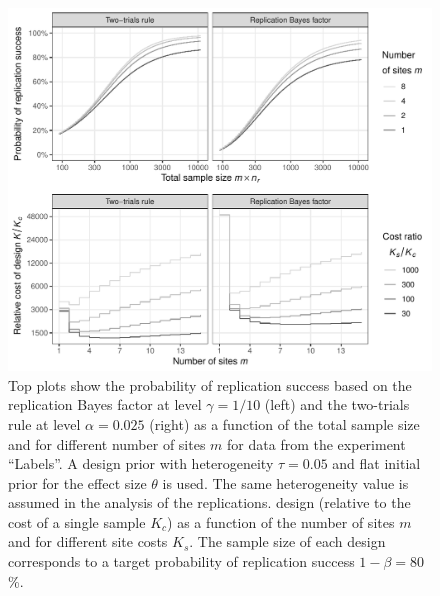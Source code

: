 \begin{figure}[!htb]
\begin{knitrout}
\color{fgcolor}
\includegraphics[width=\textwidth]{images/paper3/multisite-protzko-1}
\end{knitrout}
\caption{Top plots show the probability of replication success based on the
  replication Bayes factor at level $\gamma = 1/10$ (left) and the
  two-trials rule at level $\alpha = 0.025$ (right) as a function of
  the total sample size and for different number of sites $m$ for data from the
  experiment ``Labels''. A design prior with heterogeneity
  $\tau = 0.05$ and flat initial prior for the effect size
  $\theta$ is used. The same heterogeneity value is assumed in the analysis of the
  replications. %
  design (relative to the cost of a single sample $K_{c}$) as a function of the
  number of sites $m$ and for different site costs $K_{s}$. The sample size of
  each design corresponds to a target probability of replication success
  $1 - \beta = 80$\%.}
\label{fig3:multisite}
\end{figure}

